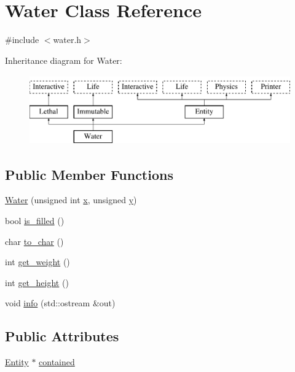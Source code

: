 \hypertarget{class_water}{\section{Water Class Reference}
\label{class_water}
}


{\ttfamily \#include $<$water.\-h$>$}

Inheritance diagram for Water\-:\begin{figure}[H]
\begin{center}
\leavevmode
\includegraphics[height=3.000000cm]{class_water}
\end{center}
\end{figure}
\subsection*{Public Member Functions}
\begin{DoxyCompactItemize}
\item 
\hyperlink{class_water_ab5347dafc5898a03fd556f1640d0fd55}{Water} (unsigned int \hyperlink{class_entity_afa8f48eccdb09a290e2c1ded3f135363}{x}, unsigned \hyperlink{class_entity_a9d39843430829a89bb8233dbaadae4f1}{y})
\item 
bool \hyperlink{class_water_a063397ad0da6b286bdad0a27cc646cb4}{is\-\_\-filled} ()
\item 
char \hyperlink{class_water_a979406ad1fe514e132bf1d0e50802f49}{to\-\_\-char} ()
\item 
int \hyperlink{class_water_a3f9cea082bd0a91d0e8a3b5737d3fbd2}{get\-\_\-weight} ()
\item 
int \hyperlink{class_water_a090400fa44c929081aa6b097ed6f16e7}{get\-\_\-height} ()
\item 
void \hyperlink{class_water_a0931381448954bfc525aa6492860f599}{info} (std\-::ostream \&out)
\end{DoxyCompactItemize}
\subsection*{Public Attributes}
\begin{DoxyCompactItemize}
\item 
\hyperlink{class_entity}{Entity} $\ast$ \hyperlink{class_water_a71b18a4a6cbd58ebbe7c927a84eaab3c}{contained}
\end{DoxyCompactItemize}


